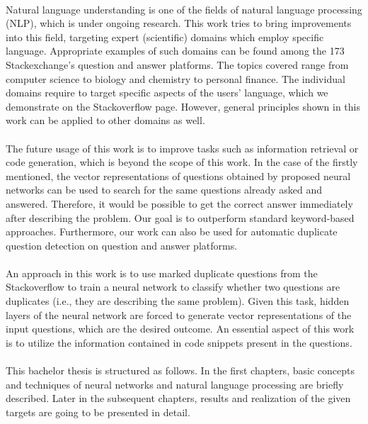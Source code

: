 \paragraph{}
Natural language understanding is one of the fields of natural language processing (NLP), which is under ongoing research. This work tries to bring improvements into this field, targeting expert (scientific) domains which employ specific language. Appropriate examples of such domains can be found among the 173 Stackexchange's question and answer platforms. The topics covered range from computer science to biology and chemistry to personal finance. The individual domains require to target specific aspects of the users' language, which we demonstrate on the Stackoverflow page. However, general principles shown in this work can be applied to other domains as well.

\paragraph{}
The future usage of this work is to improve tasks such as information retrieval or code generation, which is beyond the scope of this work. In the case of the firstly mentioned, the vector representations of questions obtained by proposed neural networks can be used to search for the same questions already asked and answered. Therefore, it would be possible to get the correct answer immediately after describing the problem. Our goal is to outperform standard keyword-based approaches. Furthermore, our work can also be used for automatic duplicate question detection on question and answer platforms.

\paragraph{}
An approach in this work is to use marked duplicate questions from the Stackoverflow to train a neural network to classify whether two questions are duplicates (i.e., they are describing the same problem). Given this task, hidden layers of the neural network are forced to generate vector representations of the input questions, which are the desired outcome. An essential aspect of this work is to utilize the information contained in code snippets present in the questions.

\paragraph{}
This bachelor thesis is structured as follows. In the first chapters, basic concepts and techniques of neural networks and natural language processing are briefly described. Later in the subsequent chapters, results and realization of the given targets are going to be presented in detail.